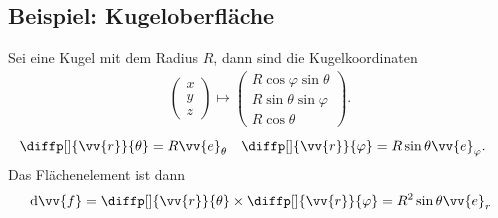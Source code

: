 \documentclass[a4paper,12pt]{article}
\newcommand{\td}{\,\text{d}}
\numberwithin{equation}{section}
\begin{document}
\subsection{Beispiel: Kugeloberfläche}
Sei eine Kugel mit dem Radius $R$, dann sind die Kugelkoordinaten
\begin{align} 
        \begin{pmatrix}
                x\\y\\z
        \end{pmatrix}\mapsto \begin{pmatrix}
                R\cos \varphi \sin \theta \\R\sin \theta \sin \varphi \\R\cos \theta 
        \end{pmatrix}
.\end{align} 
\begin{align} 
        \diffp[]{\vv{r}}{\theta }&=R\vv{e}_\theta &\diffp[]{\vv{r}}{\varphi }&=R\sin \theta \vv{e}_\varphi 
.\end{align} 
Das Flächenelement ist dann
\begin{align} 
        \td \vv{f}=\diffp[]{\vv{r}}{\theta }\times \diffp[]{\vv{r}}{\varphi }=R^2\sin \theta \vv{e}_r
\end{align} 

\end{document}
